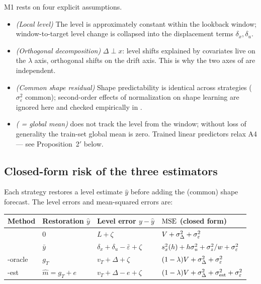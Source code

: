 M1 rests on four explicit assumptions.
\begin{itemize}
  \item[\textbf{A1}] \emph{(Local level)} The level is approximately constant within the lookback window; window-to-target level change is collapsed into the displacement terms $\delta_x,\delta_u$.
  \item[\textbf{A2}] \emph{(Orthogonal decomposition)} $\Delta \perp x$: level shifts explained by covariates live on the $\lambda$ axis, orthogonal shifts on the drift axis. This is why the two axes of  are independent.
  \item[\textbf{A3}] \emph{(Common shape residual)} Shape predictability is identical across strategies ($\sigma_\varepsilon^2$ common); second-order effects of normalization on shape learning are ignored here and checked empirically in .
  \item[\textbf{A4}] \emph{(\rawm{} = global mean)} \rawm{} does not track the level from the window; without loss of generality the train-set global mean is zero. Trained linear predictors relax A4 --- see Proposition~2$'$ below.
\end{itemize}

\subsection{Closed-form risk of the three estimators}

Each strategy restores a level estimate $\hat y$ before adding the (common) shape forecast. The level errors and mean-squared errors are:

\begin{center}
\begin{tabular}{@{}llll@{}}
\toprule
Method & Restoration $\hat y$ & Level error $y - \hat y$ & $\mathrm{MSE}$ (closed form) \\
\midrule
\rawm{} & $0$ & $L + \zeta$ & $V + \sigma_\Delta^2 + \sigma_\varepsilon^2$ \\
\inm{} & $\bar y$ & $\delta_x + \delta_u - \bar\varepsilon + \zeta$ & $s_x^2(h) + h\sigma_u^2 + \sigma_z^2/w + \sigma_\varepsilon^2$ \\
\cnm{}-oracle & $g_T$ & $v_T + \Delta + \zeta$ & $(1-\lambda)V + \sigma_\Delta^2 + \sigma_\varepsilon^2$ \\
\cnm{}-est & $\hat m = g_T + e$ & $v_T + \Delta - e + \zeta$ & $(1-\lambda)V + \sigma_\Delta^2 + \sigma_{\mathrm{est}}^2 + \sigma_\varepsilon^2$ \\
\bottomrule
\end{tabular}
\end{center}

